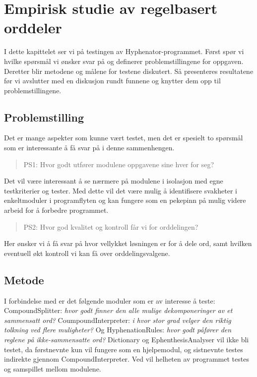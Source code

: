 \chapter{Empirisk studie av regelbasert orddeler}

I dette kapittelet ser vi på testingen av Hyphenator-programmet. Først spør vi hvilke spørsmål vi ønsker svar på og definerer problemstillingene for oppgaven. Deretter blir metodene og målene for testene diskutert. Så presenteres resultatene før vi avslutter med en diskusjon rundt funnene og knytter dem opp til problemstillingene. 

\section{Problemstilling}

Det er mange aspekter som kunne vært testet, men det er spesielt to spørsmål som er interessante å få svar på i denne sammenhengen.

\begin{quote}
PS1: Hvor godt utfører modulene oppgavene sine hver for seg?
\end{quote}

Det vil være interessant å se nærmere på modulene i isolasjon med egne testkriterier og tester. Med dette vil det være mulig å identifisere svakheter i enkeltmoduler i programflyten og kan fungere som en pekepinn på mulig videre arbeid for å forbedre programmet.

\begin{quote}
PS2: Hvor god kvalitet og kontroll får vi for orddelingen?
\end{quote}

Her ønsker vi å få svar på hvor vellykket løsningen er for å dele ord, samt hvilken eventuell økt kontroll vi kan få over orddelingsvalgene.

\section{Metode}

I forbindelse med  er det følgende moduler som er av interesse å teste: CompoundSplitter: \textit{hvor godt finner den alle mulige dekomponeringer av et sammensatt ord?} CoumpoundInterpreter: \textit{i hvor stor grad velger den riktig tolkning ved flere muligheter?} Og HyphenationRules: \textit{hvor godt påfører den reglene på ikke-sammensatte ord?} Dictionary og EphenthesisAnalyser vil ikke bli testet, da førstnevnte kun vil fungere som en hjelpemodul, og sistnevnte testes indirekte gjennom CompoundInterpreter. Ved  vil helheten av programmet testes og samspillet mellom modulene.

